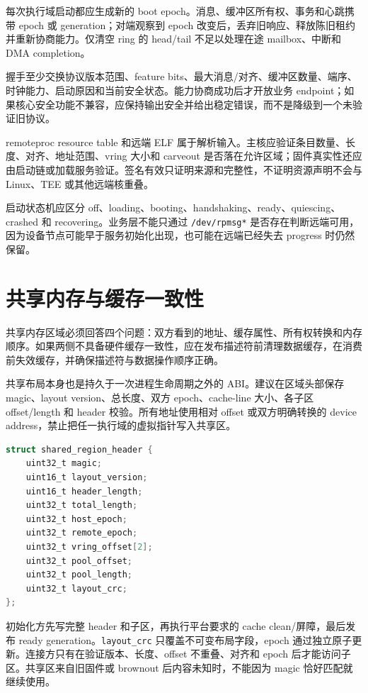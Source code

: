 每次执行域启动都应生成新的 boot epoch。消息、缓冲区所有权、事务和心跳携带 epoch 或 generation；对端观察到 epoch 改变后，丢弃旧响应、释放陈旧租约并重新协商能力。仅清空 ring 的 head/tail 不足以处理在途 mailbox、中断和 DMA completion。

握手至少交换协议版本范围、feature bits、最大消息/对齐、缓冲区数量、端序、时钟能力、启动原因和当前安全状态。能力协商成功后才开放业务 endpoint；如果核心安全功能不兼容，应保持输出安全并给出稳定错误，而不是降级到一个未验证旧协议。

remoteproc resource table 和远端 ELF 属于解析输入。主核应验证条目数量、长度、对齐、地址范围、vring 大小和 carveout 是否落在允许区域；固件真实性还应由启动链或加载服务验证。签名有效只证明来源和完整性，不证明资源声明不会与 Linux、TEE 或其他远端核重叠。

启动状态机应区分 off、loading、booting、handshaking、ready、quiescing、crashed 和 recovering。业务层不能只通过 \texttt{/dev/rpmsg*} 是否存在判断远端可用，因为设备节点可能早于服务初始化出现，也可能在远端已经失去 progress 时仍然保留。

\section{共享内存与缓存一致性}

共享内存区域必须回答四个问题：双方看到的地址、缓存属性、所有权转换和内存顺序。如果两侧不具备硬件缓存一致性，应在发布描述符前清理数据缓存，在消费前失效缓存，并确保描述符与数据操作顺序正确。

共享布局本身也是持久于一次进程生命周期之外的 ABI。建议在区域头部保存 magic、layout version、总长度、双方 epoch、cache-line 大小、各子区 offset/length 和 header 校验。所有地址使用相对 offset 或双方明确转换的 device address，禁止把任一执行域的虚拟指针写入共享区。

\begin{lstlisting}[language=C,caption={共享内存布局头的逻辑字段}]
struct shared_region_header {
    uint32_t magic;
    uint16_t layout_version;
    uint16_t header_length;
    uint32_t total_length;
    uint32_t host_epoch;
    uint32_t remote_epoch;
    uint32_t vring_offset[2];
    uint32_t pool_offset;
    uint32_t pool_length;
    uint32_t layout_crc;
};
\end{lstlisting}

初始化方先写完整 header 和子区，再执行平台要求的 cache clean/屏障，最后发布 ready generation。\texttt{layout\_crc} 只覆盖不可变布局字段，epoch 通过独立原子更新。连接方只有在验证版本、长度、offset 不重叠、对齐和 epoch 后才能访问子区。共享区来自旧固件或 brownout 后内容未知时，不能因为 magic 恰好匹配就继续使用。

